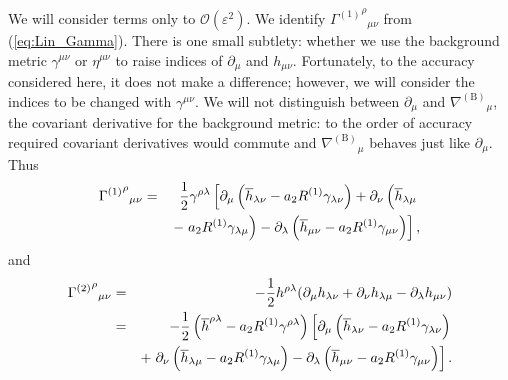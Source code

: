\documentclass[aps,prd,amsfonts,amssymb,amsmath,nofootinbib,reprint,showpacs]{revtex4-1}
\newcommand{\eqnref}[1]{(\ref{eq:#1})}
\newcommand{\order}[1]{\ensuremath{\mathcal{O}({#1})}}
\begin{document}
We will consider terms only to $\order{\varepsilon^2}$. We identify ${{\Gamma^{(1)}}^\rho}_{\mu\nu}$ from \eqnref{Lin_Gamma}. There is one small subtlety: whether we use the background metric $\gamma^{\mu\nu}$ or $\eta^{\mu\nu}$ to raise indices of $\partial_\mu$ and $h_{\mu\nu}$. Fortunately, to the accuracy considered here, it does not make a difference; however, we will consider the indices to be changed with $\gamma^{\mu\nu}$. We will not distinguish between $\partial_\mu$ and ${\nabla^{(\text{B})}}_\mu$, the covariant derivative for the background metric: to the order of accuracy required covariant derivatives would commute and ${\nabla^{(\text{B})}}_\mu$ behaves just like $\partial_\mu$. Thus
\begin{eqnarray}
{{\Gamma^{(1)}}^\rho}_{\mu\nu} & = & \frac{1}{2}\gamma^{\rho\lambda}\left[\partial_\mu \left(\overline{h}_{\lambda\nu} - a_2 R^{(1)}\gamma_{\lambda\nu}\right) + \partial_\nu \left(\overline{h}_{\lambda\mu} \vphantom{R^{(1)}} \right. \right. \nonumber \\* 
 & & \left. - \left. a_2 R^{(1)}\gamma_{\lambda\mu}\right) - \partial_\lambda \left(\overline{h}_{\mu\nu} - a_2 R^{(1)}\gamma_{\mu\nu}\right)\right],
\end{eqnarray}
and
\begin{eqnarray}
{{\Gamma^{(2)}}^\rho}_{\mu\nu} & = & -\frac{1}{2}h^{\rho\lambda}(\partial_\mu h_{\lambda\nu} + \partial_\nu h_{\lambda\mu} - \partial_\lambda h_{\mu\nu}) \nonumber \\*
 & = & -\frac{1}{2}\left(\overline{h}^{\rho\lambda} - a_2 R^{(1)}\gamma^{\rho\lambda}\right)\left[\partial_\mu \left(\overline{h}_{\lambda\nu} - a_2 R^{(1)}\gamma_{\lambda\nu}\right)  \right. \nonumber \\*
 & & + \left. \partial_\nu \left(\overline{h}_{\lambda\mu} - a_2 R^{(1)}\gamma_{\lambda\mu}\right) - \partial_\lambda \left(\overline{h}_{\mu\nu} \vphantom{R^{(1)}} - a_2 R^{(1)}\gamma_{\mu\nu}\right)\right].
\end{eqnarray}
\end{document}

